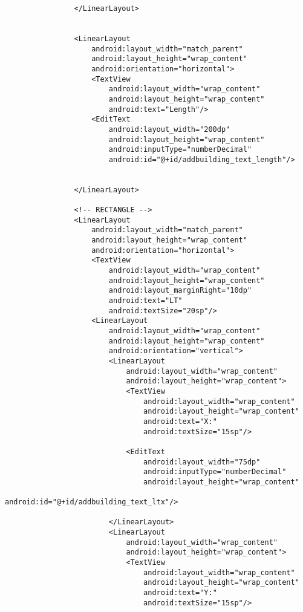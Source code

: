 \begin{lstlisting}
                </LinearLayout>


                <LinearLayout
                    android:layout_width="match_parent"
                    android:layout_height="wrap_content"
                    android:orientation="horizontal">
                    <TextView
                        android:layout_width="wrap_content"
                        android:layout_height="wrap_content"
                        android:text="Length"/>
                    <EditText
                        android:layout_width="200dp"
                        android:layout_height="wrap_content"
                        android:inputType="numberDecimal"
                        android:id="@+id/addbuilding_text_length"/>


                </LinearLayout>

                <!-- RECTANGLE -->
                <LinearLayout
                    android:layout_width="match_parent"
                    android:layout_height="wrap_content"
                    android:orientation="horizontal">
                    <TextView
                        android:layout_width="wrap_content"
                        android:layout_height="wrap_content"
                        android:layout_marginRight="10dp"
                        android:text="LT"
                        android:textSize="20sp"/>
                    <LinearLayout
                        android:layout_width="wrap_content"
                        android:layout_height="wrap_content"
                        android:orientation="vertical">
                        <LinearLayout
                            android:layout_width="wrap_content"
                            android:layout_height="wrap_content">
                            <TextView
                                android:layout_width="wrap_content"
                                android:layout_height="wrap_content"
                                android:text="X:"
                                android:textSize="15sp"/>

                            <EditText
                                android:layout_width="75dp"
                                android:inputType="numberDecimal"
                                android:layout_height="wrap_content"
                                android:id="@+id/addbuilding_text_ltx"/>

                        </LinearLayout>
                        <LinearLayout
                            android:layout_width="wrap_content"
                            android:layout_height="wrap_content">
                            <TextView
                                android:layout_width="wrap_content"
                                android:layout_height="wrap_content"
                                android:text="Y:"
                                android:textSize="15sp"/>


\end{lstlisting}
